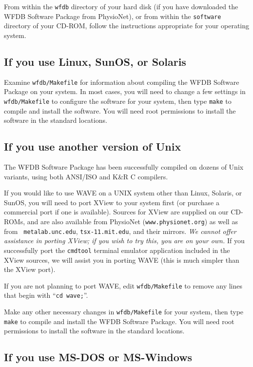 From within the {\tt wfdb} directory of your hard disk (if you have
downloaded the WFDB Software Package from PhysioNet), or from
within the {\tt software} directory of your CD-ROM, follow the instructions
appropriate for your operating system.

\subsection*{If you use Linux, SunOS, or Solaris}

Examine {\tt wfdb/Makefile} for information about compiling the WFDB Software
Package on your system.  In most cases, you will need to change a few settings
in {\tt wfdb/Makefile} to configure the software for your system, then type
{\tt make} to compile and install the software.  You will need root permissions
to install the software in the standard locations.

\subsection*{If you use another version of Unix}

The WFDB Software Package has been successfully compiled on dozens of Unix
variants, using both ANSI/ISO and K\&R C compilers.

If you would like to use {\sf WAVE} on a UNIX system other than Linux,
Solaris, or SunOS, you will need to port XView to your system first
(or purchase a commercial port if one is available).  Sources for
XView are supplied on our CD-ROMs, and are also available from PhysioNet
({\tt www.physionet.org}) as well as from {\tt
metalab.unc.edu}, {\tt tsx-11.mit.edu}, and their mirrors.  \emph{We
cannot offer assistance in porting XView; if you wish to try this, you
are on your own.}  If you successfully port the {\tt cmdtool} terminal
emulator application included in the XView sources, we will assist you
in porting {\sf WAVE} (this is much simpler than the XView port).

If you are not planning to port {\sf WAVE}, edit {\tt wfdb/Makefile} to
remove any lines that begin with ``{\tt cd wave;}''.

Make any other necessary changes in {\tt wfdb/Makefile} for your
system, then type {\tt make} to compile and install the WFDB Software
Package.  You will need root permissions to install the software in the
standard locations.


\subsection*{If you use MS-DOS or MS-Windows}

